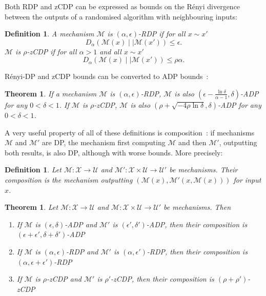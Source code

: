 \documentclass[english,twoside,openright]{HYgraduMLDS}
\newtheorem{theorem}[lemma]{Theorem}
\newtheorem{definition}[lemma]{Definition}
\newcommand{\dmid}{\mid\mid}
\newcommand{\calm}{{\mathcal{M}}}
\newcommand{\calx}{{\mathcal{X}}}
\newcommand{\calu}{{\mathcal{U}}}
\begin{document}
Both RDP and zCDP can be expressed as bounds on the
Rényi divergence between the outputs of a randomised algorithm with
neighbouring inputs:

\begin{definition}
    A mechanism \(\calm\) is \((\alpha, \epsilon)\)-RDP
    if for all \(x \sim x'\)
    \[
        D_\alpha(\calm(x)\dmid \calm(x')) \leq \epsilon.
    \]
    \(\calm\) is \(\rho\)-zCDP if for all \(\alpha > 1\)
    and all \(x \sim x'\)
    \[
        D_\alpha(\calm(x)\dmid \calm(x')) \leq \rho \alpha.
    \]

\end{definition}

Rényi-DP and zCDP bounds can be converted to ADP bounds~\cite{Mironov17, BuS16}:
\begin{theorem}\label{other_dp_to_adp}
    If a mechanism \(\calm\) is \((\alpha, \epsilon)\)-RDP, \(\calm\) is also
    \((\epsilon - \frac{\ln \delta}{\alpha - 1}, \delta)\)-ADP for any 
    \(0 < \delta < 1\). If \(\calm\) is \(\rho\)-zCDP, \(\calm\) is also 
    \((\rho + \sqrt{-4\rho\ln \delta}, \delta)\)-ADP for any \(0 < \delta < 1\).
\end{theorem}

A very useful property of all of these definitions is composition~\cite{DwR14}: 
if mechanisms \(\calm\) and \(\calm'\) are DP, the mechanism first computing
\(\calm\) and then \(\calm'\), outputting both results, 
is also DP, although with worse bounds.
More precisely:

\begin{definition}\label{composition_definition}
    Let \(\calm\colon \calx \to \calu\) and 
    \(\calm'\colon \calx\times \calu \to \calu'\) be mechanisms.
    Their composition is the mechanism outputting
    \((\calm(x), \calm'(x, \calm(x)))\) for input \(x\).
\end{definition}

\begin{theorem}\label{composition-theorem}
    Let \(\calm\colon \calx \to \calu\) and 
    \(\calm\colon \calx\times \calu \to \calu'\) be mechanisms. Then
    \begin{enumerate}
        \item 
            If \(\calm\) is \((\epsilon, \delta)\)-ADP and 
            \(\calm'\) is \((\epsilon', \delta')\)-ADP, then 
            their composition is 
            \((\epsilon + \epsilon', \delta + \delta')\)-ADP~\cite{DKM06}
        \item 
            If \(\calm\) is \((\alpha, \epsilon)\)-RDP and 
            \(\calm'\) is \((\alpha, \epsilon')\)-RDP, then 
            their composition is \((\alpha, \epsilon + \epsilon')\)-RDP~\cite{Mironov17}
        \item 
            If \(\calm\) is \(\rho\)-zCDP and 
            \(\calm'\) is \(\rho'\)-zCDP, then 
            their composition is \((\rho + \rho')\)-zCDP~\cite{BuS16}
    \end{enumerate}
\end{theorem}
\end{document}
